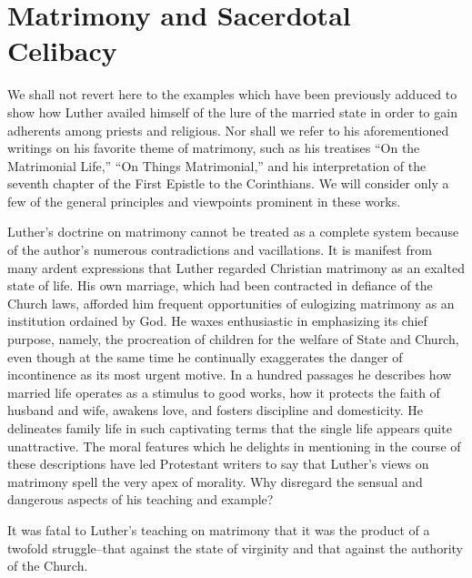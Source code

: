 \section{Matrimony and Sacerdotal Celibacy}

We shall not revert here to the examples which have been previously adduced
to show how Luther availed himself of the lure of
the married state in order to gain adherents among priests and religious.
Nor shall we refer to his aforementioned writings on his
favorite theme of matrimony, such as his treatises “On the Matrimonial
Life,” “On Things Matrimonial,” and his interpretation of
the seventh chapter of the First Epistle to the Corinthians. We will
consider only a few of the general principles and viewpoints prominent in these works.

Luther’s doctrine on matrimony cannot be treated as a complete
system because of the author’s numerous contradictions and vacillations.
It is manifest from many ardent expressions that Luther regarded Christian
matrimony as an exalted state of life. His own marriage,
which had been contracted in defiance of the Church laws,
afforded him frequent opportunities of eulogizing matrimony as an
institution ordained by God. He waxes enthusiastic in emphasizing its
chief purpose, namely, the procreation of children for the welfare of
State and Church, even though at the same time he continually exaggerates
the danger of incontinence as its most urgent motive. In a
hundred passages he describes how married life operates as a stimulus
to good works, how it protects the faith of husband and wife, awakens love,
and fosters discipline and domesticity. He delineates family
life in such captivating terms that the single life appears quite unattractive.
The moral features which he delights in mentioning in
the course of these descriptions have led Protestant writers to say
that Luther’s views on matrimony spell the very apex of morality.
Why disregard the sensual and dangerous aspects of his teaching and
example?

It was fatal to Luther’s teaching on matrimony that it was the
product of a twofold struggle--that against the state of virginity
and that against the authority of the Church.

